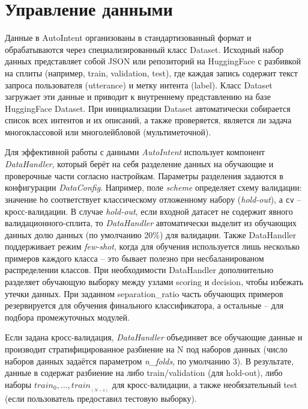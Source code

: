 \documentclass[14pt,a4paper,oneside,openany]{extbook}
\begin{document}
\section{Управление данными}
\label{sec:orgf90f2ac}
Данные в AutoIntent организованы в стандартизованный формат и обрабатываются через специализированный класс Dataset. Исходный набор данных представляет собой JSON или репозиторий на HuggingFace с разбивкой на сплиты (например, train, validation, test), где каждая запись содержит текст запроса пользователя (utterance) и метку интента (label). Класс Dataset загружает эти данные и приводит к внутреннему представлению на базе HuggingFace Dataset. При инициализации Dataset автоматически собирается список всех интентов и их описаний, а также проверяется, является ли задача многоклассовой или многолейбловой (мультиметочной).

Для эффективной работы с данными \emph{AutoIntent} использует компонент \emph{DataHandler}, который берёт на себя разделение данных на обучающие и проверочные части согласно настройкам. Параметры разделения задаются в конфигурации \emph{DataConfig}. Например, поле \emph{scheme} определяет схему валидации: значение \texttt{ho} соответствует классическому отложенному набору (\emph{hold-out}), а \texttt{cv} – кросс-валидации. В случае \emph{hold-out}, если входной датасет не содержит явного валидационного-сплита, то \emph{DataHandler} автоматически выделит из обучающих данных долю данных (по умолчанию 20\%) для валидации. Также DataHandler поддерживает режим \emph{few-shot}, когда для обучения используется лишь несколько примеров каждого класса – это бывает полезно при несбаланированом распределении классов. При необходимости DataHandler дополнительно разделяет обучающую выборку между узлами scoring и decision, чтобы избежать утечки данных. При заданном separation\_ratio часть обучающих примеров резервируется для обучения финального классификатора, а остальные – для подбора промежуточных модулей.

Если задана кросс-валидация, \emph{DataHandler} объединяет все обучающие данные и производит стратифицированное разбиение на N под наборов данных (число наборов данных задаётся параметром \emph{n\_folds}, по умолчанию 3). В результате, данные в содержат разбиение на либо train/validation (для hold-out), либо наборы \(train_0, \dots, train_{_(N-1)}\) для кросс-валидации, а также необязательный test (если пользователь предоставил тестовую выборку).
\end{document}
